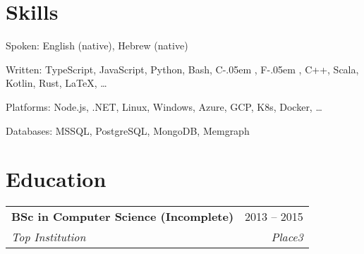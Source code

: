 \documentclass[a4paper,11pt]{article}
\makeatletter
\newcommand{\sharplang}[1]{%
    {\settoheight{\dimen0}{#1}#1\kern-.05em \resizebox{!}{\dimen0}{\raisebox{\depth}{\#}}}%
}
\newcommand{\placeblock}[4]{%
    \vspace{-2pt}\item%
    \begin{tabular*}{0.97\textwidth}[t]{l@{\extracolsep{\fill}}r}%
        \textbf{#1} & #2 \\%
        \textit{\small#3} & \textit{\small #4} \\%
    \end{tabular*}\vspace{-7pt}%
}%
\newcommand{\technion}{Technion}
\newcommand{\haifa}{Haifa, Israel}
\renewcommand{\technion}{Top Institution}
\renewcommand{\haifa}{Place3}
\makeatother
\begin{document}
\section{Skills}
\begin{skillList}
    \item[Spoken:] English (native), Hebrew (native)
    \item[Written:] TypeScript, JavaScript, Python, Bash, \sharplang{C}, \sharplang{F}, C++, Scala, Kotlin, Rust, \LaTeX, \dots
    \item[Platforms:] Node.js, .NET, Linux, Windows, Azure, GCP, K8s, Docker, \dots
    \item[Databases:] MSSQL, PostgreSQL, MongoDB, Memgraph
\end{skillList}

\section{Education}
\begin{sectionList}%
    \placeblock{BSc in Computer Science (Incomplete)}{2013 -- 2015}{\technion}{\haifa}
\end{sectionList}

\end{document}
